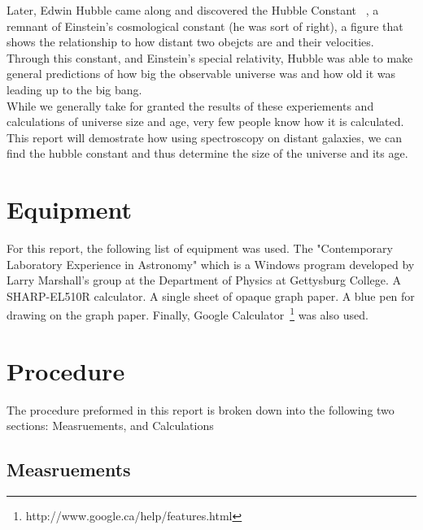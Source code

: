 \documentclass{article}
\begin{document}
Later, Edwin Hubble came along and discovered the Hubble Constant~\cite{lem:1927}
, a remnant of
Einstein's cosmological constant (he was sort of right), a figure that shows
the relationship to how distant two obejcts are and their velocities. Through this
constant, and Einstein's special relativity,
Hubble was able to make general predictions of how big the observable
universe was and how old it was leading up to the big bang.\\

While we generally take for granted the results of these experiements and calculations
of universe size and age, very few people know how it is calculated. This report will
demostrate how using spectroscopy on distant galaxies, we can find the hubble constant
and thus determine the size of the universe and its age.


\section{Equipment}

For this report, the following list of equipment was used. The "Contemporary Laboratory
Experience in Astronomy" which is a Windows program developed by Larry Marshall's group
at the Department of Physics at Gettysburg College. A SHARP-EL510R calculator. A single
sheet of opaque graph paper. A blue pen for drawing on the graph paper. Finally, Google
Calculator~\footnote{http://www.google.ca/help/features.html} was also used.


\section{Procedure}

The procedure preformed in this report is broken down into the following two sections:
Measruements, and Calculations

\subsection{Measruements}
\end{document}
